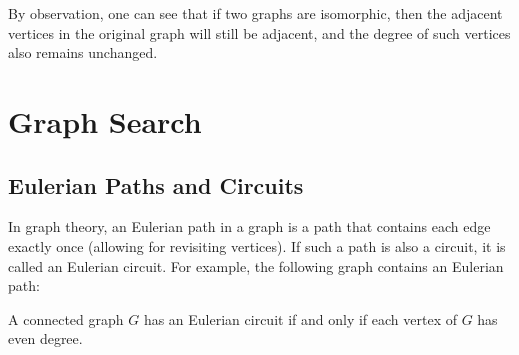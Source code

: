 By observation, one can see that if two graphs are isomorphic, then the adjacent vertices in the original graph will still be adjacent, and the degree of such vertices also remains unchanged.

\section{Graph Search}
\subsection{Eulerian Paths and Circuits}
In graph theory, an Eulerian path in a graph is a path that contains each edge exactly once (allowing for revisiting vertices). If such a path is also a circuit, it is called an Eulerian circuit. For example, the following graph contains an Eulerian path:
\begin{figure}[H]
  \centering
\end{figure}
\begin{remark}
  A connected graph \(G\) has an Eulerian circuit if and only if each vertex of \(G\) has even degree.
\end{remark}

\newpage
